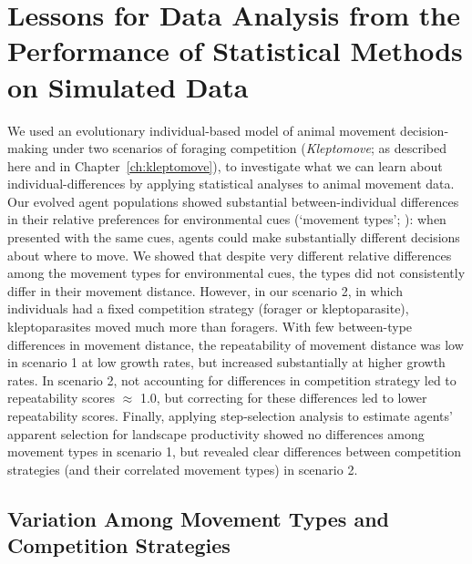     \section*{Lessons for Data Analysis from the Performance of Statistical Methods on Simulated Data}
    
    
    We used an evolutionary individual-based model of animal movement decision-making under two scenarios of foraging competition (\textit{Kleptomove}; as described here and in Chapter~\ref{ch:kleptomove}), to investigate what we can learn about individual-differences by applying statistical analyses to animal movement data.
    Our evolved agent populations showed substantial between-individual differences in their relative preferences for environmental cues (`movement types'; \citealt{getz2015}): when presented with the same cues, agents could make substantially different decisions about where to move.
    We showed that despite very different relative differences among the movement types for environmental cues, the types did not consistently differ in their movement distance.
    However, in our scenario 2, in which individuals had a fixed competition strategy (forager or kleptoparasite), kleptoparasites moved much more than foragers.
    With few between-type differences in movement distance, the repeatability of movement distance was low in scenario 1 at low growth rates, but increased substantially at higher growth rates.
    In scenario 2, not accounting for differences in competition strategy led to repeatability scores $\approx$ 1.0, but correcting for these differences led to lower repeatability scores.
    Finally, applying step-selection analysis to estimate agents' apparent selection for landscape productivity showed no differences among movement types in scenario 1, but revealed clear differences between competition strategies (and their correlated movement types) in scenario 2.
    
    \subsection*{Variation Among Movement Types and Competition Strategies}
    
